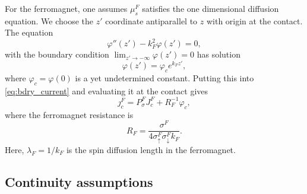 For the ferromagnet, one assumes $μ_s^F$ satisfies
the one dimensional diffusion equation.
We choose the $z'$ coordinate antiparallel to $z$ with origin at the contact.
The equation
\begin{equation}
  \label{eq:diffusion.ferromagnet}
  φ'' \left( z' \right) - k_F^2 φ \left( z' \right) = 0,
\end{equation}
with the boundary condition
$\lim_{z' → - ∞} φ(z') = 0$
has solution
\begin{equation}
  \label{eq:diffusion.ferromagnet.solution}
  φ(z') = φ_c e^{k_F z'},
\end{equation}
where $φ_c = φ(0)$ is a yet undetermined constant.
Putting this into \cref{eq:bdry_current} and evaluating it at the contact gives
\begin{equation}
  \label{eq:bdry_current.ferromagnet}
  ȷ^F_c = P_σ^F J^F_c + R_F^{-1} φ_c,
\end{equation}
where the ferromagnet resistance is
\begin{equation}
  \label{eq:ferromagnet.resistance}
  R_F = \frac{σ^F}{4 σ_↑^F σ_↓^F k_F}.
\end{equation}
Here, $λ_F = 1 / k_F$ is the spin diffusion length in the ferromagnet.

\subsection{Continuity assumptions}

